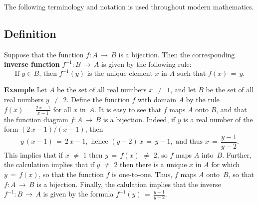 
\VV

        The following terminology and notation is used throughout modern mathematics.

\V

        \subsection{\small{\bf Definition}}
        \label{DefA30.26A}

\V

        Suppose that the function $f:A \,{\rightarrow}\, B$ is a bijection.
    Then the corresponding {\bf inverse function} $f^{-1}:B \,{\rightarrow}\, A$ is given by the following rule:
        \begin{displaymath}
        \mbox{If $y{\in}B$, then $f^{-1}(y)$ is the unique element $x$ in $A$ such that $f(x) \,=\, y$.}
        \end{displaymath}

\V

        {\bf Example} Let $A$ be the set of all real numbers $x \,\,{\neq}\,\, 1$, and let $B$ be the set of all real numbers $y \,\,{\neq}\,\, 2$.
    Define the function $f$ with domain $A$ by the rule $f(x) \,=\, {\displaystyle \frac{2\,x-1}{x-1}}$ for all $x$ in~$A$.
    It is easy to see that $f$ maps $A$ onto $B$, and that the function diagram $f:A \,{\rightarrow}\, B$ is a bijection.
    Indeed, if $y$ is a real number of the form $(2\,x-1)/(x-1)$, then
        \begin{displaymath}
        y\,(x-1) \,=\, 2\,x-1, \mbox{ hence } (y-2)\,x \,=\, y-1, \mbox{ and thus } x \,=\, \frac{y-1}{y-2}.
        \end{displaymath}
    This implies that if $x \,\,{\neq}\,\, 1$ then $y \,=\, f(x) \,\,{\neq}\,\, 2$, so $f$ maps $A$ into~$B$.
    Further, the calculation implies that if $y \,\,{\neq}\,\, 2$ then there is a unique $x$ in $A$ for which $y \,=\, f(x)$, so that the function $f$ is one-to-one.
    Thus, $f$ maps $A$ onto~$B$, so that $f:A \,{\rightarrow}\, B$ is a bijection.
    Finally, the calulation implies that the inverse $f^{-1}:B \,{\rightarrow}\, A$ is given by the formula $f^{-1}(y) \,=\, {\displaystyle \frac{y-1}{y-2}}$.

